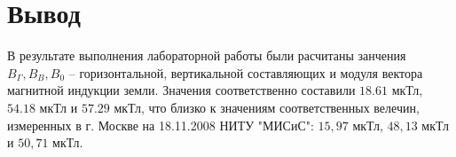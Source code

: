 \section*{Вывод}

В результате выполнения лабораторной работы были расчитаны занчения 
$ B_\Gamma, B_B, B_0 $ -- горизонтальной, вертикальной составляющих и модуля вектора магнитной индукции земли. Значения соответственно составили 
$ 18.61 $ мкТл,
$ 54.18 $ мкТл и
$ 57.29 $ мкТл,
что близко к значениям соответственных велечин,
измеренных в г. Москве на 18.11.2008 НИТУ "МИСиС":
$ 15,97 $ мкТл,
$ 48,13 $ мкТл и
$ 50,71 $ мкТл.